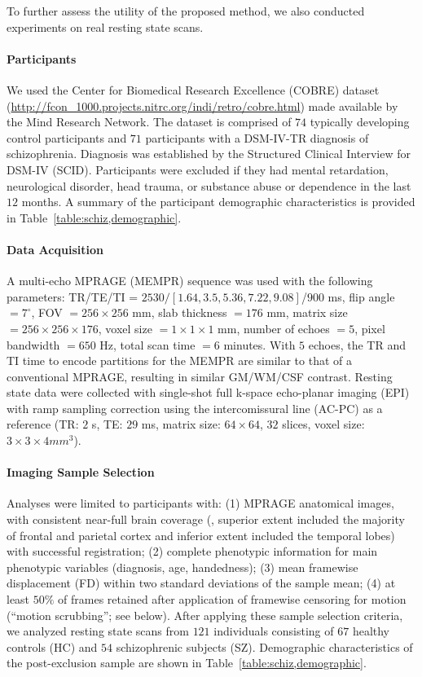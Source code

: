 To further assess the utility of the proposed method, we also conducted experiments on real resting state scans.

\paragraph{Participants}
We used the Center for Biomedical Research Excellence (COBRE) dataset (\url{http://fcon_1000.projects.nitrc.org/indi/retro/cobre.html}) made available by the Mind Research Network. 
The dataset is comprised of $74$ typically developing control participants and $71$ participants with a DSM-IV-TR diagnosis of schizophrenia. 
Diagnosis was established by the Structured Clinical Interview for DSM-IV (SCID). Participants were excluded if they had mental retardation, neurological disorder, head trauma, or substance abuse or dependence in the last $12$ months. A summary of the participant demographic characteristics is provided in Table~\ref{table:schiz,demographic}. 

\paragraph{Data Acquisition}
A multi-echo MPRAGE (MEMPR) sequence was used with the following parameters: TR/TE/TI = $2530/[1.64, 3.5, 5.36, 7.22, 9.08]$/$900$ ms, flip angle $= 7^{\circ}$, FOV $= 256\times 256$ mm, slab thickness $= 176$ mm, matrix size $= 256\times 256\times 176$, voxel size $= 1\times 1\times 1$ mm, number of echoes $= 5$, pixel bandwidth $=650$ Hz, total scan time $= 6$ minutes. 
With $5$ echoes, the TR and TI time to encode partitions for the MEMPR are similar to that of a conventional MPRAGE, resulting in similar GM/WM/CSF contrast. 
Resting state data were collected with single-shot full k-space echo-planar imaging (EPI) with ramp sampling correction using the intercomissural line (AC-PC) as a reference (TR: $2$ s, TE: $29$ ms, matrix size: $64\times 64$, $32$ slices, voxel size: $3\times 3\times 4 mm^3$).

\paragraph{Imaging Sample Selection}
Analyses were limited to participants with: 
(1) MPRAGE anatomical images, with consistent near-full brain coverage (\ie, superior extent included the majority of frontal and parietal cortex and inferior extent included the temporal lobes) with successful registration; 
(2) complete phenotypic information for main phenotypic variables (diagnosis, age, handedness); 
(3) mean framewise displacement (FD) within two standard deviations of the sample mean; 
(4) at least $50\%$ of frames retained after application of framewise censoring for motion (``motion scrubbing''; see below).
After applying these sample selection criteria, we analyzed resting state scans from $121$ individuals consisting of $67$ healthy controls (HC) and $54$ schizophrenic subjects (SZ). 
Demographic characteristics of the post-exclusion sample are shown in Table~\ref{table:schiz,demographic}.

